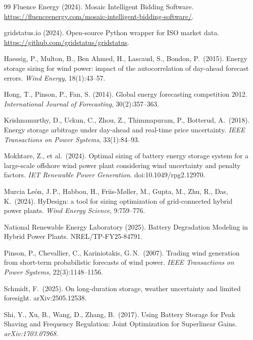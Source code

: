 \documentclass[11pt]{article}
\begin{document}
\begin{thebibliography}{99}
Fluence Energy (2024). Mosaic Intelligent Bidding Software. \url{https://fluenceenergy.com/mosaic-intelligent-bidding-software/}.

gridstatus.io (2024). Open-source Python wrapper for ISO market data. \url{https://github.com/gridstatus/gridstatus}.

Haessig, P., Multon, B., Ben Ahmed, H., Lascaud, S., Bondon, P.\ (2015). Energy storage sizing for wind power: impact of the autocorrelation of day-ahead forecast errors. \emph{Wind Energy}, 18(1):43--57.

Hong, T., Pinson, P., Fan, S. (2014). Global energy forecasting competition 2012. \emph{International Journal of Forecasting}, 30(2):357--363.

Krishnamurthy, D., Uckun, C., Zhou, Z., Thimmapuram, P., Botterud, A.\ (2018). Energy storage arbitrage under day-ahead and real-time price uncertainty. \emph{IEEE Transactions on Power Systems}, 33(1):84--93.

Mokhtare, Z., et al.\ (2024). Optimal sizing of battery energy storage system for a large-scale offshore wind power plant considering wind uncertainty and penalty factors. \emph{IET Renewable Power Generation}. doi:10.1049/rpg2.12970.

Murcia Le\'{o}n, J.\,P., Habbou, H., Friis-M\o ller, M., Gupta, M., Zhu, R., Das, K.\ (2024). HyDesign: a tool for sizing optimization of grid-connected hybrid power plants. \emph{Wind Energy Science}, 9:759--776.

National Renewable Energy Laboratory (2025). Battery Degradation Modeling in Hybrid Power Plants. NREL/TP-FY25-84791.

Pinson, P., Chevallier, C., Kariniotakis, G.\,N.\ (2007). Trading wind generation from short-term probabilistic forecasts of wind power. \emph{IEEE Transactions on Power Systems}, 22(3):1148--1156.

Schmidt, F.\ (2025). On long-duration storage, weather uncertainty and limited foresight. arXiv:2505.12538.

Shi, Y., Xu, B., Wang, D., Zhang, B.\ (2017). Using Battery Storage for Peak Shaving and Frequency Regulation: Joint Optimization for Superlinear Gains. \emph{arXiv:1703.07968}.


\end{thebibliography}
\end{document}
